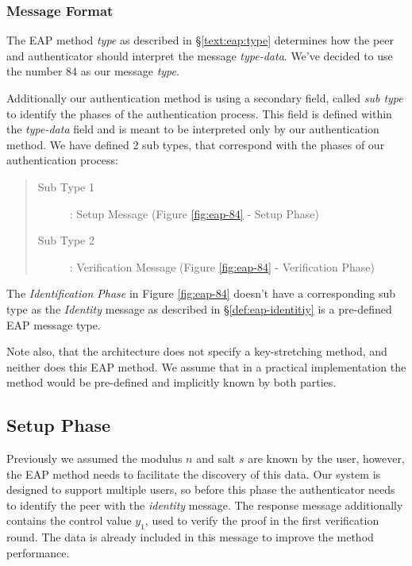 \subsubsection{Message Format}
The EAP method \textit{type} as described in \S\ref{text:eap:type} determines how the peer and authenticator should interpret the message \textit{type-data}.
We've decided to use the number $84$ as our message \textit{type}.

Additionally our authentication method is using a secondary field, called \textit{sub type} to identify the phases of the authentication process.
This field is defined within the \textit{type-data} field and is meant to be interpreted only by our authentication method.
We have defined 2 sub types, that correspond with the phases of our authentication process:

\begin{quote}
	\begin{description}
		\item [Sub Type 1]: Setup Message (Figure \ref{fig:eap-84} - Setup Phase)
		\item [Sub Type 2]: Verification Message (Figure \ref{fig:eap-84} - Verification Phase)
	\end{description}
\end{quote}

The \textit{Identification Phase} in Figure \ref{fig:eap-84} doesn't have a corresponding sub type as the \textit{Identity} message as described in \S\ref{def:eap-identitiy} is a pre-defined EAP message type.

Note also, that the architecture does not specify a key-stretching method, and neither does this EAP method.
We assume that in a practical implementation the method would be pre-defined and implicitly known by both parties.

\subsection{Setup Phase}
Previously we assumed the modulus $n$ and salt $s$ are known by the user, however, the EAP method needs to facilitate the discovery of this data.
Our system is designed to support multiple users, so before this phase the authenticator needs to identify the peer with the \textit{identity} message.
The response message additionally contains the control value $y_1$, used to verify the proof in the first verification round. The data is already included in this message to improve the method performance.

